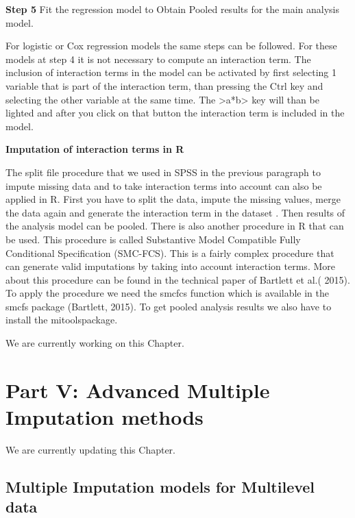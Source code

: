 \documentclass[
]{book}
\begin{document}
\textbf{Step 5}
Fit the regression model to Obtain Pooled results for the main analysis model.

For logistic or Cox regression models the same steps can be followed. For these models at step 4 it is not necessary to compute an interaction term. The inclusion of interaction terms in the model can be activated by first selecting 1 variable that is part of the interaction term, than pressing the Ctrl key and selecting the other variable at the same time. The \textgreater a*b\textgreater{} key will than be lighted and after you click on that button the interaction term is included in the model.

\textbf{Imputation of interaction terms in R}

The split file procedure that we used in SPSS in the previous paragraph to impute missing data and to take interaction terms into account can also be applied in R. First you have to split the data, impute the missing values, merge the data again and generate the interaction term in the dataset . Then results of the analysis model can be pooled.
There is also another procedure in R that can be used. This procedure is called Substantive Model Compatible Fully Conditional Specification (SMC-FCS). This is a fairly complex procedure that can generate valid imputations by taking into account interaction terms. More about this procedure can be found in the technical paper of Bartlett et al.( 2015). To apply the procedure we need the smcfcs function which is available in the smcfs package (Bartlett, 2015). To get pooled analysis results we also have to install the mitoolspackage.

We are currently working on this Chapter.

\hypertarget{part-part-v-advanced-multiple-imputation-methods}{%
\part{Part V: Advanced Multiple Imputation methods}\label{part-part-v-advanced-multiple-imputation-methods}}

We are currently updating this Chapter.

\hypertarget{multiple-imputation-models-for-multilevel-data}{%
\chapter{Multiple Imputation models for Multilevel data}\label{multiple-imputation-models-for-multilevel-data}}
\end{document}
